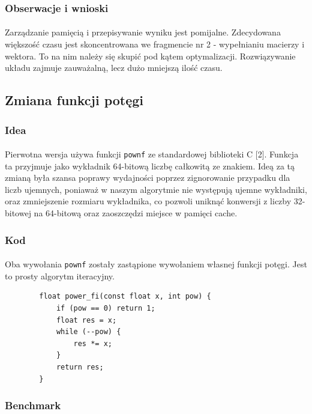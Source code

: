 \documentclass[12pt]{report}
\begin{document}
	\subsubsection{Obserwacje i wnioski}
	\paragraph{}
	Zarządzanie pamięcią i przepisywanie wyniku jest pomijalne.
	Zdecydowana większość czasu jest skoncentrowana we fragmencie nr 2 - wypełnianiu macierzy i wektora. To na nim należy się skupić pod kątem optymalizacji.
	Rozwiązywanie układu zajmuje zauważalną, lecz dużo mniejszą ilość czasu.
	
	
	\pagebreak
	\subsection{Zmiana funkcji potęgi}
	\subsubsection{Idea}
	\paragraph{}
	Pierwotna wersja używa funkcji \verb|pownf| ze standardowej biblioteki C [2]. Funkcja ta przyjmuje jako wykładnik 64-bitową liczbę całkowitą ze znakiem. Ideą za tą zmianą była szansa poprawy wydajności poprzez zignorowanie przypadku dla liczb ujemnych, poniaważ w naszym algorytmie nie występują ujemne wykładniki, oraz zmniejszenie rozmiaru wykładnika, co pozwoli uniknąć konwersji z liczby 32-bitowej na 64-bitową oraz zaoszczędzi miejsce w pamięci cache.
	
	\subsubsection{Kod}
	\paragraph{}
	Oba wywołania \verb|pownf| zostały zastąpione wywołaniem własnej funkcji potęgi. Jest to prosty algorytm iteracyjny.
	\begin{verbatim}
		float power_fi(const float x, int pow) {
			if (pow == 0) return 1;
			float res = x;
			while (--pow) {
				res *= x;
			}
			return res;
		}
	\end{verbatim}
	
	\subsubsection{Benchmark}
\end{document}
